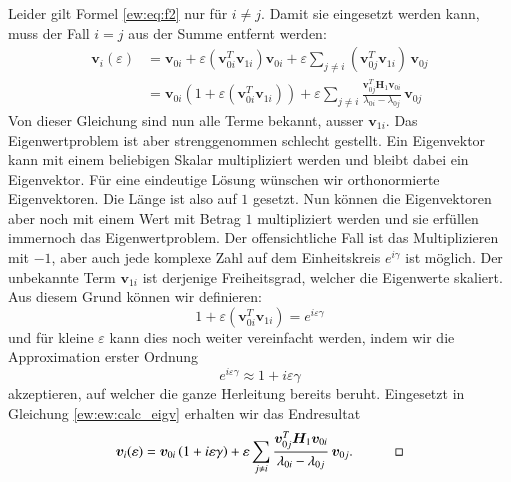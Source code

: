 Leider gilt Formel \eqref{ew:eq:f2} nur für $i \neq j$. Damit sie eingesetzt werden kann, muss der Fall $i = j$ aus der Summe entfernt werden:
\begin{align}
    \bm v_i(\varepsilon)
    &=
    \bm v_{0i} + \varepsilon \left( \bm v_{0i}^T \bm v_{1i} \right) \bm v_{0i} + \varepsilon \sum_{j \neq i} \left(\bm v_{0j}^T \bm v_{1i} \right) \, \bm v_{0j} \\
    &=
    \bm v_{0i} \left( 1 + \varepsilon(\bm v_{0i}^T \bm v_{1i}) \right) + \varepsilon \sum_{j \neq i}
    \frac{\bm v_{0j}^T \bm H_1 \bm v_{0i}}{\lambda_{0i} - \lambda_{0j}}
    \, \bm v_{0j} \label{ew:ew:calc_eigv}
\end{align}
Von dieser Gleichung sind nun alle Terme bekannt, ausser $\bm v_{1i}$.
Das Eigenwertproblem ist aber strenggenommen schlecht gestellt.
Ein Eigenvektor kann mit einem beliebigen Skalar multipliziert werden und bleibt dabei ein Eigenvektor.
Für eine eindeutige Lösung wünschen wir orthonormierte Eigenvektoren.
Die Länge ist also auf $1$ gesetzt.
Nun können die Eigenvektoren aber noch mit einem Wert mit Betrag $1$ multipliziert werden und sie erfüllen immernoch das Eigenwertproblem.
Der offensichtliche Fall ist das Multiplizieren mit $-1$, aber auch jede komplexe Zahl auf dem Einheitskreis $e^{i\gamma}$ ist möglich.
Der unbekannte Term $\bm v_{1i}$ ist derjenige Freiheitsgrad, welcher die Eigenwerte skaliert.
Aus diesem Grund können wir definieren:
\begin{equation}
    1 + \varepsilon (\bm v_{0i}^T \bm v_{1i}) = e^{i \varepsilon \gamma}
\end{equation}
und für kleine $\varepsilon$ kann dies noch weiter vereinfacht werden, indem wir die Approximation erster Ordnung
\begin{equation}
    e^{i \varepsilon \gamma} \approx 1 + i \varepsilon \gamma
\end{equation}
akzeptieren, auf welcher die ganze Herleitung bereits beruht.
Eingesetzt in Gleichung \eqref{ew:ew:calc_eigv} erhalten wir das Endresultat
\begin{equation}
    \bm v_i(\varepsilon)
    =
    \bm v_{0i} \left( 1 + i \varepsilon \gamma \right) + \varepsilon \sum_{j \neq i}
    \frac{\bm v_{0j}^T \bm H_1 \bm v_{0i}}{\lambda_{0i} - \lambda_{0j}}
    \, \bm v_{0j}.
    \quad
    \qed
    \label{ew:eq:explicit_eigvecs}
\end{equation}

